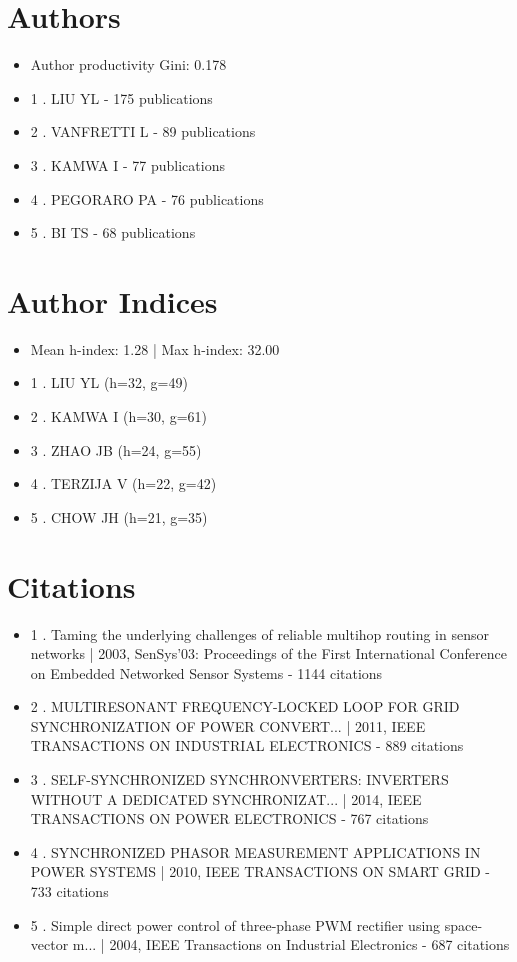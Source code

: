 \documentclass[12pt]{article}
\begin{document}
\section*{Authors}
\begin{itemize}
\item Author productivity Gini: 0.178
\item 1 . LIU YL - 175 publications
\item 2 . VANFRETTI L - 89 publications
\item 3 . KAMWA I - 77 publications
\item 4 . PEGORARO PA - 76 publications
\item 5 . BI TS - 68 publications
\end{itemize}
\section*{Author Indices}
\begin{itemize}
\item Mean h-index: 1.28 | Max h-index: 32.00
\item 1 . LIU YL (h=32, g=49)
\item 2 . KAMWA I (h=30, g=61)
\item 3 . ZHAO JB (h=24, g=55)
\item 4 . TERZIJA V (h=22, g=42)
\item 5 . CHOW JH (h=21, g=35)
\end{itemize}
\section*{Citations}
\begin{itemize}
\item 1 . Taming the underlying challenges of reliable multihop routing in sensor networks | 2003, SenSys'03: Proceedings of the First International Conference on Embedded Networked Sensor Systems - 1144 citations
\item 2 . MULTIRESONANT FREQUENCY-LOCKED LOOP FOR GRID SYNCHRONIZATION OF POWER CONVERT... | 2011, IEEE TRANSACTIONS ON INDUSTRIAL ELECTRONICS - 889 citations
\item 3 . SELF-SYNCHRONIZED SYNCHRONVERTERS: INVERTERS WITHOUT A DEDICATED SYNCHRONIZAT... | 2014, IEEE TRANSACTIONS ON POWER ELECTRONICS - 767 citations
\item 4 . SYNCHRONIZED PHASOR MEASUREMENT APPLICATIONS IN POWER SYSTEMS | 2010, IEEE TRANSACTIONS ON SMART GRID - 733 citations
\item 5 . Simple direct power control of three-phase PWM rectifier using space-vector m... | 2004, IEEE Transactions on Industrial Electronics - 687 citations
\end{itemize}
\end{document}
